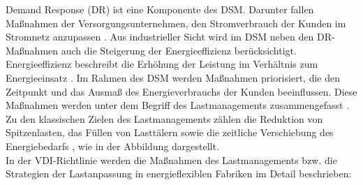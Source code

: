 Demand Response (DR) ist eine Komponente des DSM. Darunter fallen Maßnahmen der Versorgungsunternehmen, den Stromverbrauch der Kunden im Stromnetz anzupassen \cite{waltherMethodologyClassificationCharacterisation2022}. Aus industrieller Sicht wird im DSM neben den DR-Maßnahmen auch die Steigerung der Energieeffizienz berücksichtigt. Energieeffizienz beschreibt die Erhöhung der Leistung im Verhältnis zum Energieeinsatz \cite{palenskyDemandSideManagement2011, lampropoulosCriteriaDemandResponse2013}. Im Rahmen des DSM werden Maßnahmen priorisiert, die den Zeitpunkt und das Ausmaß des Energieverbrauchs der Kunden beeinflussen. Diese Maßnahmen werden unter dem Begriff des Lastmanagements zusammengefasst \cite{gellingsSmartGridEnabling2020}. Zu den klassischen Zielen des Lastmanagements zählen die Reduktion von Spitzenlasten, das Füllen von Lasttälern sowie die zeitliche Verschiebung des Energiebedarfs \cite{VDI5207Blatt2020, waltherMethodologyClassificationCharacterisation2022}, wie in der Abbildung  dargestellt.\\

In der VDI-Richtlinie \cite{VDI5207Blatt2020} werden die Maßnahmen des Lastmanagements bzw. die Strategien der Lastanpassung in energieflexiblen Fabriken im Detail beschrieben: 

